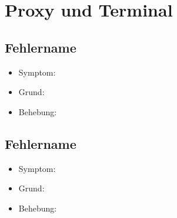 \documentclass[qualitaetssicherung.tex]{subfiles}
\begin{document}
\section{Proxy und Terminal}

	\subsection{Fehlername}
		\begin{itemize}
			\item
			Symptom:
			\item
			Grund:
			\item
			Behebung:
		\end{itemize}
		
	\subsection{Fehlername}
		\begin{itemize}
			\item
			Symptom:
			\item
			Grund:
			\item
			Behebung:
		\end{itemize}
		
\end{document}
